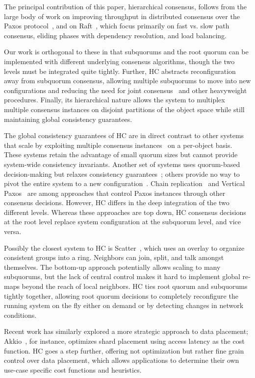 \documentclass[10pt,conference]{IEEEtran}
\newcommand{\hc}{hierarchical consensus\xspace}
\newcommand{\sub}{subquorum\xspace}
\newcommand{\subs}{subquorums\xspace}
\newcommand{\roo}{root quorum\xspace}
\begin{document}
The principal contribution of this paper, \hc, follows from the
large body of work on improving throughput in distributed consensus
over the Paxos protocol~\cite{paxos_simple,epaxos,flexible_paxos,generalized_paxos},
and on Raft~\cite{raft,raft_refloated}, which focus primarily on fast vs.
slow path consensus, eliding phases with dependency resolution, and load
balancing.

Our work is orthogonal to these in that \subs and the \roo can be
implemented with different underlying consensus algorithms, though the
two levels must be integrated quite tightly.
Further, HC abstracts reconfiguration away from \sub consensus, allowing
multiple \subs to move into new configurations and reducing the need
for joint consensus~\cite{raft} and other heavyweight procedures.
Finally, its hierarchical nature allows the system to multiplex multiple
consensus instances on disjoint partitions of the object space while
still maintaining global consistency guarantees.

The global consistency guarantees of HC are in direct contrast to other
systems that scale by exploiting multiple consensus
instances~\cite{mdcc,spanner} on a per-object basis.
These systems retain the advantage of small quorum sizes but cannot provide
system-wide consistency invariants.
Another set of systems uses quorum-based decision-making but relaxes
consistency guarantees~\cite{dynamo,pnuts}; others provide no way to
pivot the entire system to a new configuration~\cite{scatter}.
Chain replication~\cite{chain_replication} and Vertical Paxos~\cite{vertical_paxos,niobe}
are among approaches that control Paxos instances through other consensus decisions.
However, HC differs in the deep integration of the two different levels.
Whereas these approaches are top down, HC consensus decisions at the root
level replace system configuration at the \sub level, and vice versa.

Possibly the closest system to HC is Scatter~\cite{scatter}, which uses an
overlay to organize consistent groups into a ring.
Neighbors can join, split, and talk amongst themselves.
The bottom-up approach potentially allows scaling to many
\subs, but the lack of central control makes it hard to implement global
re-maps beyond the reach of local neighbors.
HC ties \roo and \subs tightly together, allowing \roo decisions to
completely reconfigure the running system on the fly either on demand or
by detecting changes in network conditions.

Recent work has similarly explored a more strategic approach to data placement;
Akkio~\cite{akkio}, for instance, optimizes shard placement using access
latency as the cost function.
HC goes a step further, offering not optimization but rather fine grain control
over data placement, which allows applications to determine their own
use-case specific cost functions and heuristics.
\end{document}
